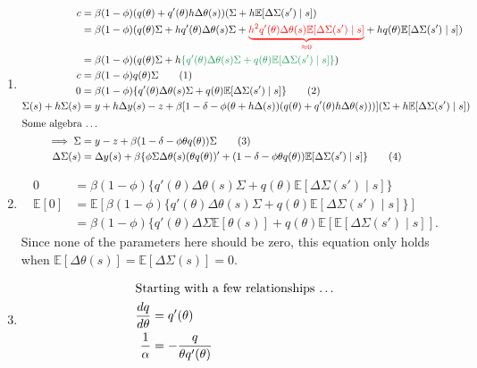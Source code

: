 \documentclass[11pt]{article}
\newcommand{\gr}{\textcolor{ForestGreen}}
\newcommand{\rd}{\textcolor{red}}
\newcommand{\E}{\mathbb{E}}
\begin{document}
  \begin{enumerate}[label=\alph*)]
\item
  \begin{align*}
c &= \beta (1 - \phi) (q(\theta) + q'(\theta) h \Delta \theta (s))(\Sigma + h \E [\Delta \Sigma (s') \mid s])\\
&= \beta (1 - \phi) (q(\theta) \Sigma + hq'(\theta)\Delta \theta (s) \Sigma + \rd{\underbrace{h^2 q'(\theta) \Delta \theta(s) \E[\Delta \Sigma (s') \mid s]}_{\approx 0}} + hq(\theta) \E [\Delta \Sigma (s') \mid s])\\
&= \beta (1 - \phi) (q(\theta)\Sigma + h\gr{\left\{q'(\theta) \Delta \theta (s) \Sigma + q(\theta) \E[\Delta  \Sigma (s') \mid s]\right\}})\\
c &= \beta (1 - \phi) q(\theta)\Sigma \tag{1}\\
0 &= \beta (1- \phi) \{q'(\theta) \Delta \theta (s) \Sigma + q(\theta) \E [\Delta \Sigma (s') \mid s]\}\tag{2}\\
\Sigma (s) + h \Sigma (s) &= y + h \Delta y(s) - z + \beta [1 - \delta - \phi (\theta + h\Delta (s))(q(\theta) + q'(\theta) h \Delta \theta (s)))](\Sigma + h \E[\Delta \Sigma (s')\mid s])\\
\intertext{Some algebra \ldots}
\implies \Sigma &= y - z + \beta (1 - \delta - \phi \theta q(\theta))\Sigma\tag{3}\\
\Delta \Sigma (s) &= \Delta y(s) + \beta \{\phi \Sigma \Delta \theta (s) (\theta q(\theta))' + (1 - \delta - \phi \theta q(\theta)) \E [\Delta \Sigma (s') \mid s]\}\tag{4}
  \end{align*}
\item
\begin{align*}
0 &= \beta (1- \phi) \{q'(\theta) \Delta \theta (s) \Sigma + q(\theta) \E [\Delta \Sigma (s') \mid s]\}\\
\E[0] &= \E[\beta (1- \phi) \{q'(\theta) \Delta \theta (s) \Sigma + q(\theta) \E [\Delta \Sigma (s') \mid s]\}]\\
&= \beta (1 - \phi) \{q'(\theta) \Delta \Sigma \E[\theta (s)] + q(\theta) \E[\E[\Delta \Sigma (s') \mid s]].
\end{align*}
Since none of the parameters here should be zero, this equation only holds when $\E[\Delta \theta (s)] = \E [\Delta \Sigma (s)] = 0$.
\item
\begin{align*}
\intertext{Starting with a few relationships \ldots}
\frac{dq}{d\theta} &= q'(\theta)\\
\frac{1}{\alpha} &= -\frac{q}{\theta q'(\theta)}\\

\end{align*}
\end{enumerate}
\end{document}
